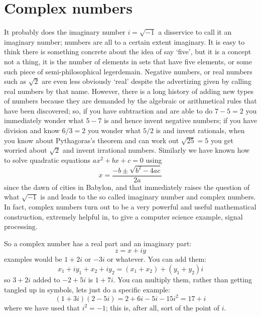 \documentclass[12pt]{article}
\begin{document}
\section*{Complex numbers}

It probably does the imaginary number $i=\sqrt{-1}$ a disservice to
call it an imaginary number; numbers are all to a certain extent
imaginary. It is easy to think there is something concrete about the
idea of say `five', but it is a concept not a thing, it is the number
of elements in sets that have five elements, or some such piece of
semi-philosophical legerdemain. Negative numbers, or real numbers such
as $\sqrt{2}$ are even less obviously `real' despite the advertizing
given by calling real numbers by that name. However, there is a long
history of adding new types of numbers because they are demanded by
the algebraic or arithmetical rules that have been discovered; so, if
you have subtraction and are able to do $7-5=2$ you immediately wonder
what $5-7$ is and hence invent negative numbers; if you have division
and know $6/3=2$ you wonder what $5/2$ is and invent rationals, when
you know about Pythagoras's theorem and can work out $\sqrt{25}=5$ you
get worried about $\sqrt{2}$ and invent irrational numbers. Similarly we have
known how to solve quadratic equations $ax^2+bx+c=0$ using
\begin{equation}
  x=\frac{-b\pm\sqrt{b^2-4ac}}{2a}
\end{equation}
since the dawn of cities in Babylon, and that immediately raises the
question of what $\sqrt{-1}$ is and leads to the so called imaginary
number and complex numbers. In fact, complex numbers turn out to be a
very powerful and useful mathematical construction, extremely helpful
in, to give a computer science example, signal processing.

So a complex number has a real part and an imaginary part:
\begin{equation}
  z=x+iy
\end{equation}
examples would be $1+2i$ or $-3i$ or whatever. You can add them:
\begin{equation}
  x_1+iy_1+x_2+iy_2=(x_1+x_2)+(y_1+y_2)i
\end{equation}
so $3+2i$ added to $-2+5i$ is $1+7i$. You can multiply them, rather than getting tangled up in symbols, lets just do a specific example:
\begin{equation}
  (1+3i)(2-5i)=2+6i-5i-15i^2=17+i
\end{equation}
where we have used that $i^2=-1$; this is, after all, sort of the
point of $i$.
\end{document}
